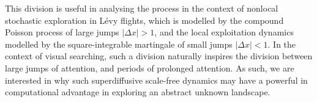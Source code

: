 This division is useful in analysing the process in the context of nonlocal stochastic exploration in Lévy flights, which is modelled by the compound Poisson process of large jumps $|\Delta x| > 1$, and the local exploitation dynamics modelled by the square-integrable martingale of small jumps $|\Delta x| < 1$. In the context of visual searching, such a division naturally inspires the division between large jumps of attention, and periods of prolonged attention. As such, we are interested in why such superdiffusive scale-free dynamics may have a powerful in computational advantage in exploring an abstract unknown landscape.